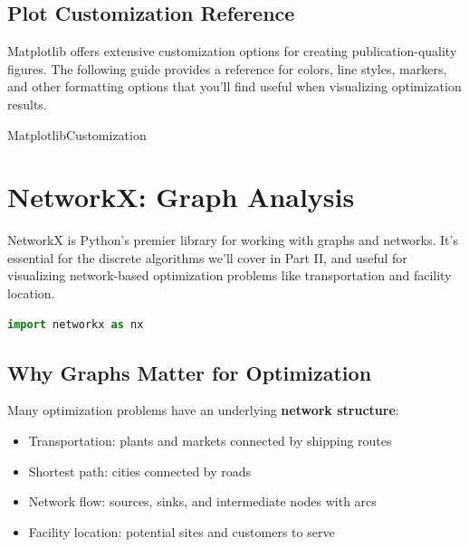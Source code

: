 
\subsection{Plot Customization Reference}

Matplotlib offers extensive customization options for creating publication-quality figures. The following guide provides a reference for colors, line styles, markers, and other formatting options that you'll find useful when visualizing optimization results.

{MatplotlibCustomization}

\section{NetworkX: Graph Analysis}

NetworkX is Python's premier library for working with graphs and networks. It's essential for the discrete algorithms we'll cover in Part II, and useful for visualizing network-based optimization problems like transportation and facility location.

\begin{lstlisting}[language=Python]
import networkx as nx
\end{lstlisting}

\subsection{Why Graphs Matter for Optimization}

Many optimization problems have an underlying \textbf{network structure}:
\begin{itemize}
\item Transportation: plants and markets connected by shipping routes
\item Shortest path: cities connected by roads
\item Network flow: sources, sinks, and intermediate nodes with arcs
\item Facility location: potential sites and customers to serve
\end{itemize}


